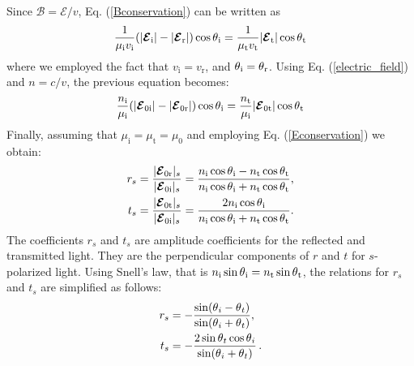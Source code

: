 Since $\boldsymbol{\mathcal{B}} = \boldsymbol{\mathcal{E}}/v$, Eq. (\ref{Bconservation}) can be written as 
\begin{equation}
\frac{1}{\mu_{\textrm{i}}v_{\textrm{i}}}(|\boldsymbol{\mathcal{E}}_{\textrm{i}}|-|\boldsymbol{\mathcal{E}}_{\textrm{r}}|)\cos\mbox{$\theta$}_{\textrm{i}} = \frac{1}{\mu_{\textrm{t}}v_{\textrm{t}}}|\boldsymbol{\mathcal{E}}_{\textrm{t}}|\cos\mbox{$\theta$}_{\textrm{t}}
\end{equation}
where we employed the fact that $v_{\textrm{i}}= v_{\textrm{r}}$, and $\mbox{$\theta$}_{\textrm{i}}= \mbox{$\theta$}_{\textrm{r}}$. 
Using Eq. (\ref{electric_field}) and $n = c/v$, the previous equation becomes:
\begin{equation}
\frac{n_{\textrm{i}}}{\mu_{\textrm{i}}}(|\boldsymbol{\mathcal{E}}_{0\textrm{i}}|-|\boldsymbol{\mathcal{E}}_{0\textrm{r}}|)\cos\mbox{$\theta$}_{\textrm{i}} = \frac{n_{\textrm{t}}}{\mu_{\textrm{i}}}|\boldsymbol{\mathcal{E}}_{0\textrm{t}}|\cos\mbox{$\theta$}_{\textrm{t}}
\end{equation}
Finally,  assuming that $\mu_{\textrm{i}}=\mu_{\textrm{t}}=\mu_{0}$ and employing Eq. (\ref{Econservation}) we obtain:
\begin{equation} \label{Fresnel_perpendicular}
\begin{split}
r_{s} & =\frac{|\boldsymbol{\mathcal{E}}_{0 \textrm{r}}|_{s}}{|\boldsymbol{\mathcal{E}}_{0\textrm{i}}|_s} = 
\frac{n_\textrm{i}\cos\mbox{$\theta$}_\textrm{i}-n_\textrm{t} \cos\mbox{$\theta$}_\textrm{t}}{n_\textrm{i}
\cos\mbox{$\theta$}_\textrm{i}+n_\textrm{t}\cos\mbox{$\theta$}_\textrm{t}},\\
t_{s} & = \frac{|\boldsymbol{\mathcal{E}}_{0 \textrm{t}}|_s}{|\boldsymbol{\mathcal{E}}_{0\textrm{i}}|_s} 
=\frac{2n_\textrm{i}\cos\mbox{$\theta$}_\textrm{i}}{n_\textrm{i}\cos\mbox{$\theta$}_\textrm{i}+n_\textrm{t}\cos\mbox{$\theta$}_\textrm{t}}.\\
\end{split}
\end{equation}
The coefficients $r_s$ and $t_s$ are amplitude coefficients for the reflected and transmitted light.
They are the perpendicular components of $r$ and $t$ for $s$-polarized light.
Using Snell's law, that is $n_{\textrm{i}}\sin\mbox{$\theta$}_{\textrm{i}} = n_{\textrm{t}}\sin\mbox{$\theta$}_{\textrm{t}}$, the relations for $r_s$ and $t_s$ are simplified as follows:
\begin{equation} \label{simple_Fresnel}
\begin{split}
r_{s} & = -\frac{\sin(\mbox{$\theta$}_i-\mbox{$\theta$}_t)}{\sin(\mbox{$\theta$}_i+\mbox{$\theta$}_t)},\\
t_{s} & = -\frac{2\sin \mbox{$\theta$}_t \cos \mbox{$\theta$}_i}{\sin(\mbox{$\theta$}_i+\mbox{$\theta$}_t)}\,.
\end{split}
\end{equation}
